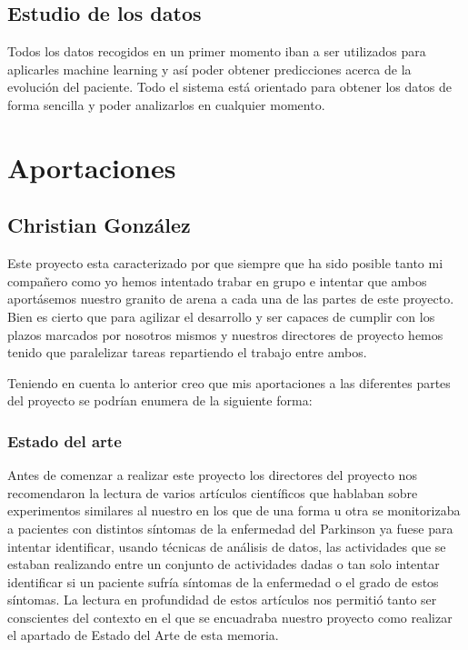 \documentclass[11pt,spanish]{article}
\begin{document}
\subsection{Estudio de los datos}
Todos los datos recogidos en un primer momento iban a ser utilizados para aplicarles machine learning y así poder obtener predicciones acerca de la evolución del paciente. Todo el sistema está orientado para obtener los datos de forma sencilla y poder analizarlos en cualquier momento.
\newpage

\section{Aportaciones}
\subsection{Christian González}

Este proyecto esta caracterizado por que siempre que ha sido posible tanto mi compañero como yo hemos intentado trabar en grupo e intentar que ambos aportásemos nuestro granito de arena a cada una de las partes de este proyecto. Bien es cierto que para agilizar el desarrollo y ser capaces de cumplir con los plazos marcados por nosotros mismos y nuestros directores de proyecto hemos tenido que paralelizar tareas repartiendo el trabajo entre ambos.

Teniendo en cuenta lo anterior creo que mis aportaciones a las diferentes partes del proyecto se podrían enumera de la siguiente forma:

\subsubsection{Estado del arte}
Antes de comenzar a realizar este proyecto los directores del proyecto nos recomendaron la lectura de varios artículos científicos que hablaban sobre experimentos similares al nuestro en los que de una forma u otra se monitorizaba a pacientes con distintos síntomas de la enfermedad del Parkinson ya fuese para intentar identificar, usando técnicas de análisis de datos, las actividades que se estaban realizando entre un conjunto de actividades dadas o tan solo intentar identificar si un paciente sufría síntomas de la enfermedad o el grado de estos síntomas. La lectura en profundidad de estos artículos nos permitió tanto ser conscientes del contexto en el que se encuadraba nuestro proyecto como realizar el apartado de Estado del Arte de esta memoria. 
\end{document}
